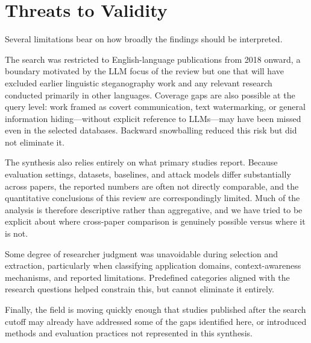\section{Threats to Validity}
\label{sec:threats}

Several limitations bear on how broadly the findings should be interpreted.

The search was restricted to English-language publications from 2018 onward, a boundary motivated by the LLM focus of the review but one that will have excluded earlier linguistic steganography work and any relevant research conducted primarily in other languages. Coverage gaps are also possible at the query level: work framed as covert communication, text watermarking, or general information hiding---without explicit reference to LLMs---may have been missed even in the selected databases. Backward snowballing reduced this risk but did not eliminate it.

The synthesis also relies entirely on what primary studies report. Because evaluation settings, datasets, baselines, and attack models differ substantially across papers, the reported numbers are often not directly comparable, and the quantitative conclusions of this review are correspondingly limited. Much of the analysis is therefore descriptive rather than aggregative, and we have tried to be explicit about where cross-paper comparison is genuinely possible versus where it is not.

Some degree of researcher judgment was unavoidable during selection and extraction, particularly when classifying application domains, context-awareness mechanisms, and reported limitations. Predefined categories aligned with the research questions helped constrain this, but cannot eliminate it entirely.

Finally, the field is moving quickly enough that studies published after the search cutoff may already have addressed some of the gaps identified here, or introduced methods and evaluation practices not represented in this synthesis.
